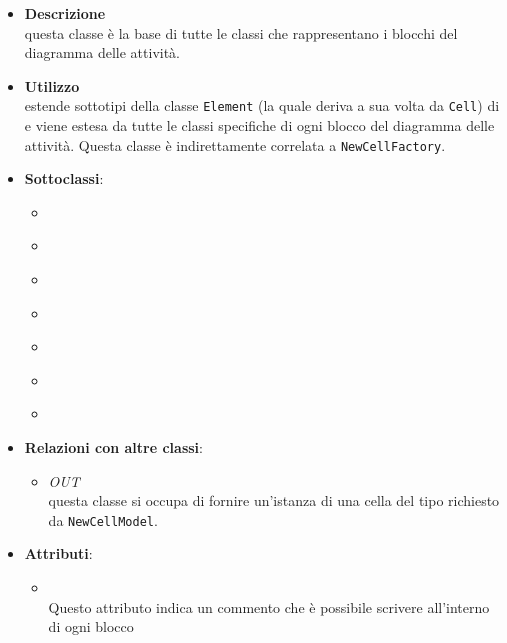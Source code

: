 \begin{itemize}
\item \textbf{Descrizione}\\
questa classe è la base di tutte le classi che rappresentano i blocchi del diagramma delle attività.
\item \textbf{Utilizzo}\\
estende sottotipi della classe \texttt{Element} (la quale deriva a sua volta da \texttt{Cell})  di \jointjs{} e viene estesa da tutte le classi specifiche di ogni blocco del diagramma delle attività. Questa classe è indirettamente correlata a \texttt{NewCellFactory}.
\item \textbf{Sottoclassi}:
\begin{itemize}
\item \hyperref[\nogloxy{swedesigner::client::model::celltypes::activity::HxCustom}]{}
\item \hyperref[\nogloxy{swedesigner::client::model::celltypes::activity::HxElse}]{}
\item \hyperref[\nogloxy{swedesigner::client::model::celltypes::activity::HxFor}]{}
\item \hyperref[\nogloxy{swedesigner::client::model::celltypes::activity::HxIf}]{}
\item \hyperref[\nogloxy{swedesigner::client::model::celltypes::activity::HxReturn}]{}
\item \hyperref[\nogloxy{swedesigner::client::model::celltypes::activity::HxVariable}]{}
\item \hyperref[\nogloxy{swedesigner::client::model::celltypes::activity::HxWhile}]{}
\end{itemize}
\item \textbf{Relazioni con altre classi}:
\begin{itemize}
\item \textit{OUT} \hyperref[\nogloxy{swedesigner::client::model::NewCellFactory}]{}\\
questa classe si occupa di fornire un'istanza di una cella del tipo richiesto da \texttt{NewCellModel}. 
\end{itemize}
\item \textbf{Attributi}:
\begin{itemize}
\item {}
\\ Questo attributo indica un commento che è possibile scrivere all'interno di ogni blocco

\end{itemize}
\end{itemize}
